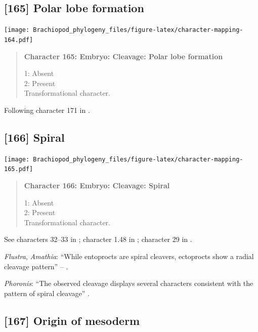 \documentclass[openany]{book}
\begin{document}
\subsection*{{[}165{]} Polar lobe formation}\label{polar-lobe-formation}

\texttt{[image: Brachiopod\_phylogeny\_files/figure-latex/character-mapping-164.pdf]}

\begin{quote}
\textbf{Character 165: Embryo: Cleavage: Polar lobe formation}

1: Absent\\
2: Present\\
Transformational character.
\end{quote}

Following character 171 in \citet{Giribet2002}.

\subsection*{{[}166{]} Spiral}\label{spiral}

\texttt{[image: Brachiopod\_phylogeny\_files/figure-latex/character-mapping-165.pdf]}

\begin{quote}
\textbf{Character 166: Embryo: Cleavage: Spiral}

1: Absent\\
2: Present\\
Transformational character.
\end{quote}

See characters 32--33 in \citet{Haszprunar1996}; character 1.48 in
\citet{SPS1996}; character 29 in \citet{Glenner2004}.

\hypertarget{Amathia-coding-166}{}
\emph{Flustra}, \emph{Amathia}: ``While entoprocts are spiral cleavers,
ectoprocts show a radial cleavage pattern'' -- \citet{Fuchs2008}.

\hypertarget{Phoronis-coding-166}{}
\emph{Phoronis}: ``The observed cleavage displays several characters
consistent with the pattern of spiral cleavage''
\citep{Pennerstorfer2012}.

\subsection*{{[}167{]} Origin of mesoderm}\label{origin-of-mesoderm}
\end{document}

